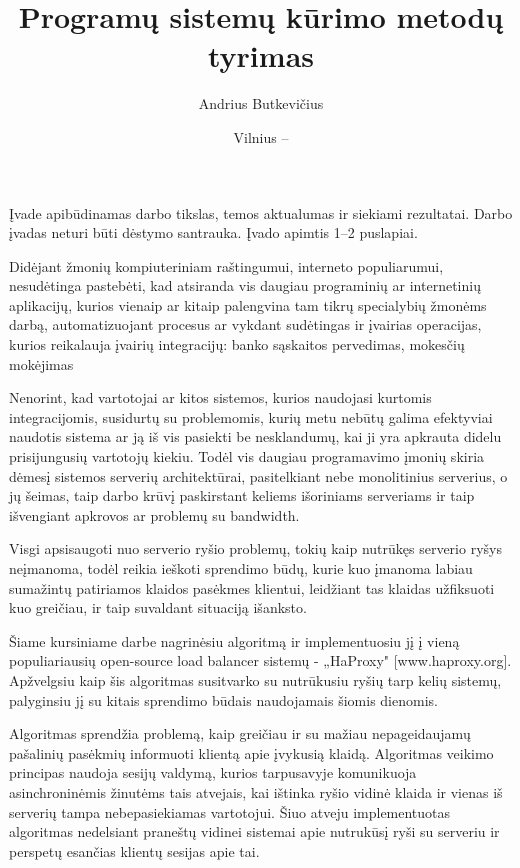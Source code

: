 \documentclass{VUMIFPSkursinis}
\title{Programų sistemų kūrimo metodų tyrimas}
\author{Andrius Butkevičius}
\date{Vilnius – \the\year}
\begin{document}
\maketitle

\tableofcontents

Įvade apibūdinamas darbo tikslas, temos aktualumas ir siekiami rezultatai.
Darbo įvadas neturi būti dėstymo santrauka. Įvado apimtis 1–2 puslapiai.

Didėjant žmonių kompiuteriniam raštingumui, interneto populiarumui, nesudėtinga pastebėti, kad atsiranda vis daugiau programinių ar internetinių aplikacijų, kurios vienaip ar kitaip palengvina tam tikrų specialybių žmonėms darbą, automatizuojant procesus ar vykdant sudėtingas ir įvairias operacijas, kurios reikalauja įvairių integracijų: banko sąskaitos pervedimas, mokesčių mokėjimas

Nenorint, kad vartotojai ar kitos sistemos, kurios naudojasi kurtomis integracijomis, susidurtų su problemomis, kurių metu nebūtų galima efektyviai naudotis sistema ar ją iš vis pasiekti be nesklandumų, kai ji yra apkrauta didelu prisijungusių vartotojų kiekiu. Todėl vis daugiau programavimo įmonių skiria dėmesį sistemos serverių architektūrai, pasitelkiant nebe monolitinius serverius, o jų šeimas, taip darbo krūvį paskirstant keliems išoriniams serveriams ir taip išvengiant apkrovos ar problemų su bandwidth.

Visgi apsisaugoti nuo serverio ryšio problemų, tokių kaip nutrūkęs serverio ryšys neįmanoma, todėl reikia ieškoti sprendimo būdų, kurie kuo įmanoma labiau sumažintų patiriamos klaidos pasėkmes klientui, leidžiant tas klaidas užfiksuoti kuo greičiau, ir taip suvaldant situaciją išanksto.

	Šiame kursiniame darbe nagrinėsiu algoritmą ir implementuosiu jį į vieną populiariausių open-source load balancer sistemų -  „HaProxy" [www.haproxy.org]. Apžvelgsiu kaip šis algoritmas susitvarko su nutrūkusiu ryšių tarp kelių sistemų, palyginsiu jį su kitais sprendimo būdais naudojamais šiomis dienomis.

Algoritmas sprendžia problemą, kaip greičiau ir su mažiau nepageidaujamų pašalinių pasėkmių informuoti klientą apie įvykusią klaidą. Algoritmas veikimo principas naudoja sesijų valdymą, kurios tarpusavyje komunikuoja asinchroninėmis žinutėms tais atvejais, kai ištinka ryšio vidinė klaida ir vienas iš serverių tampa nebepasiekiamas vartotojui. Šiuo atveju implementuotas algoritmas nedelsiant praneštų vidinei sistemai apie nutrukūsį ryši su serveriu ir perspetų esančias klientų sesijas apie tai.
\end{document}
